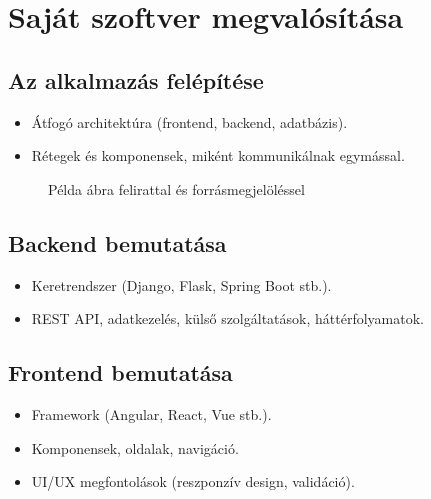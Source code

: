 \documentclass{thesis-ekf}
\begin{document}
\chapter{Saját szoftver megvalósítása}

\section{Az alkalmazás felépítése}
\begin{itemize}
  \item Átfogó architektúra (frontend, backend, adatbázis).
  \item Rétegek és komponensek, miként kommunikálnak egymással.
\end{itemize}

\begin{figure}[htbp]
\centering
{}
\caption{Példa ábra felirattal és forrásmegjelöléssel}
\end{figure}

\section{Backend bemutatása}
\begin{itemize}
  \item Keretrendszer (Django, Flask, Spring Boot stb.).
  \item REST API, adatkezelés, külső szolgáltatások, háttérfolyamatok.
\end{itemize}

\section{Frontend bemutatása}
\begin{itemize}
  \item Framework (Angular, React, Vue stb.).
  \item Komponensek, oldalak, navigáció.
  \item UI/UX megfontolások (reszponzív design, validáció).
\end{itemize}
\end{document}
